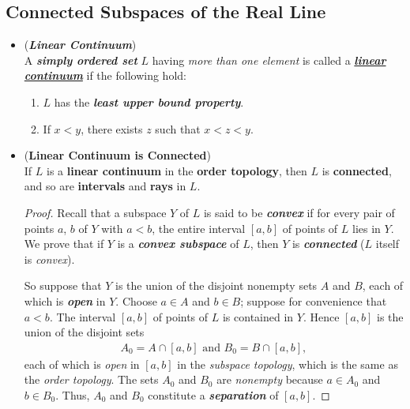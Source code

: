 \documentclass[11pt]{article}
\begin{document}
\subsection{Connected Subspaces of the Real Line}
\begin{itemize}
\item \begin{definition}(\textbf{\emph{Linear Continuum}}) \\
A \emph{\textbf{simply ordered set}} $L$ having \emph{more than one element} is called a \underline{\emph{\textbf{linear continuum}}} if the following hold:
\begin{enumerate}
\item $L$ has the \emph{\textbf{least upper bound property}}.
\item If $x < y$, there exists $z$ such that $x < z < y$.
\end{enumerate}
\end{definition}

\item \begin{proposition} (\textbf{Linear Continuum is Connected}) \citep{munkres2000topology} \\
If $L$ is a \textbf{linear continuum} in the \textbf{order topology}, then $L$ is \textbf{connected}, and so are \textbf{intervals} and \textbf{rays} in $L$.
\end{proposition}
\begin{proof}
Recall that a subspace $Y$ of $L$ is said to be \emph{\textbf{convex}} if for every pair of points $a$, $b$ of $Y$ with $a < b$, the entire interval $[a, b]$ of points of $L$ lies in $Y$. We prove that if $Y$ is a \emph{\textbf{convex subspace}} of $L$, then $Y$ is \emph{\textbf{connected}} ($L$ itself is \emph{convex}).

So suppose that $Y$ is the union of the disjoint nonempty sets $A$ and $B$, each of which is \textit{\textbf{open}} in $Y$. Choose $a \in A$ and $b \in B$; suppose for convenience that $a < b$. The interval $[a, b]$ of points of $L$ is contained in $Y$. Hence $[a, b]$ is the union of the disjoint sets
\begin{align*}
A_0 = A \cap [a, b]\text{ and }B_0 = B \cap [a, b],
\end{align*}
each of which is \emph{open} in $[a, b]$ in the \emph{subspace topology}, which is the same as the \emph{order topology}. The sets $A_0$ and $B_0$ are \emph{nonempty} because $a \in A_0$ and $b \in B_0$. Thus, $A_0$ and $B_0$ constitute a \emph{\textbf{separation}} of $[a, b]$. 


\end{proof}
\end{itemize}
\end{document}
